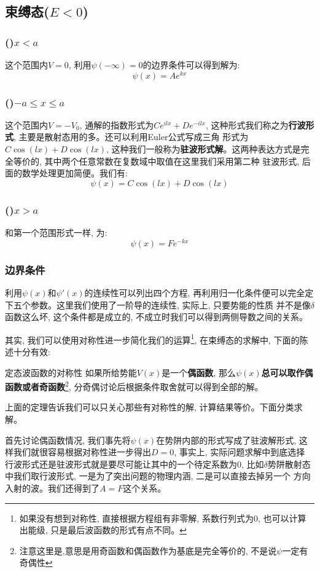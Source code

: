 \documentclass[a4paper,zihao=-4,linespread=1]{ctexrep}
\begin{document}
    \subsection*{束缚态($E<0$)}
    \subsubsection*{()$x<a$}
    这个范围内$V=0$, 利用$\psi(-\infty)=0$的边界条件可以得到解为:$$\psi(x)=Ae^{kx}$$
    \subsubsection*{()$-a\leq x\leq a$}
    这个范围内$V=-V_0$, 通解的指数形式为$Ce^{ilx}+De^{-ilx}$, 这种形式我们称之为\textbf{行波形式}, 主要是散射态用的多。还可以利用Euler公式写成三角
    形式为$C\cos (lx)+D\cos (lx)$, 这种我们一般称为\textbf{驻波形式解}。这两种表达方式是完全等价的, 其中两个任意常数在复数域中取值在这里我们采用第二种
    驻波形式, 后面的数学处理更加简便。我们有:$$\psi(x)=C\cos (lx)+D\cos (lx)$$
    \subsubsection*{()$x>a$}
    和第一个范围形式一样, 为:$$\psi(x)=Fe^{-kx}$$
    \subsubsection*{边界条件}
    利用$\psi(x)$和$\psi\prime(x)$的连续性可以列出四个方程, 再利用归一化条件便可以完全定下五个参数。这里我们使用了一阶导的连续性, 实际上, 只要势能的性质
    并不是像$\delta$函数这么坏, 这个条件都是成立的, 不成立时我们可以得到两侧导数之间的关系。

    其实, 我们可以使用对称性进一步简化我们的运算\footnote{如果没有想到对称性, 直接根据方程组有非零解, 系数行列式为0, 也可以计算出能级, 只是最后波函数的形式有点不同。}, 在束缚态的求解中, 下面的陈述十分有效:
    \begin{proposition}{定态波函数的对称性}
        如果所给势能$V(x)$是一个\textbf{偶函数}, 那么$\psi(x)$\textbf{总可以取作偶函数或者奇函数}\footnote{注意这里是,意思是用奇函数和偶函数作为基底是完全等价的, 不是说$\psi$一定有奇偶性}, 分奇偶讨论后根据条件取舍就可以得到全部的解。
    \end{proposition}
    上面的定理告诉我们可以只关心那些有对称性的解, 计算结果等价。下面分类求解。
    
    首先讨论偶函数情况, 我们事先将$\psi(x)$在势阱内部的形式写成了驻波解形式, 这样我们就很容易根据对称性进一步得出$D=0$, 事实上, 实际问题求解中到底选择
    行波形式还是驻波形式就是要尽可能让其中的一个待定系数为$0$, 比如$\delta$势阱散射态中我们取行波形式, 一是为了突出问题的物理内涵, 二是可以直接去掉另一个
    方向入射的波。我们还得到了$A=F$这个关系。
\end{document}
